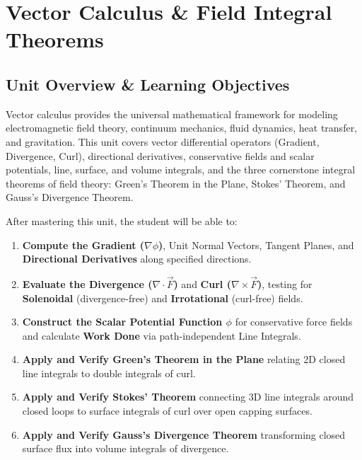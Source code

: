 \chapter{Vector Calculus \& Field Integral Theorems}
\label{chap:vector-calculus}

\section{Unit Overview \& Learning Objectives}

Vector calculus provides the universal mathematical framework for modeling electromagnetic field theory, continuum mechanics, fluid dynamics, heat transfer, and gravitation. This unit covers vector differential operators (Gradient, Divergence, Curl), directional derivatives, conservative fields and scalar potentials, line, surface, and volume integrals, and the three cornerstone integral theorems of field theory: Green's Theorem in the Plane, Stokes' Theorem, and Gauss's Divergence Theorem.

\begin{important}
After mastering this unit, the student will be able to:
\begin{enumerate}[leftmargin=1.5em]
    \item \textbf{Compute the Gradient ($\nabla\phi$)}, Unit Normal Vectors, Tangent Planes, and \textbf{Directional Derivatives} along specified directions.
    \item \textbf{Evaluate the Divergence ($\nabla\cdot\vec{F}$)} and \textbf{Curl ($\nabla\times\vec{F}$)}, testing for \textbf{Solenoidal} (divergence-free) and \textbf{Irrotational} (curl-free) fields.
    \item \textbf{Construct the Scalar Potential Function $\phi$} for conservative force fields and calculate \textbf{Work Done} via path-independent Line Integrals.
    \item \textbf{Apply and Verify Green's Theorem in the Plane} relating 2D closed line integrals to double integrals of curl.
    \item \textbf{Apply and Verify Stokes' Theorem} connecting 3D line integrals around closed loops to surface integrals of curl over open capping surfaces.
    \item \textbf{Apply and Verify Gauss's Divergence Theorem} transforming closed surface flux into volume integrals of divergence.
\end{enumerate}
\end{important}

